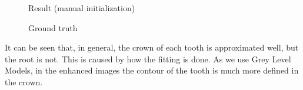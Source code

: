 \begin{figure}[!htb] \centering
  \begin{minipage}{0.49\textwidth}
  \caption{Result (manual initialization)}
\end{minipage}
\begin{minipage}{0.49\textwidth} \centering
  \caption{Ground truth}
 \end{minipage}
\end{figure}

It can be seen that, in general, the crown of each tooth is
approximated well, but the root is not. This is caused by how
the fitting is done. As we use Grey Level Models, in the enhanced
images the contour of the tooth is much more defined in the crown.

